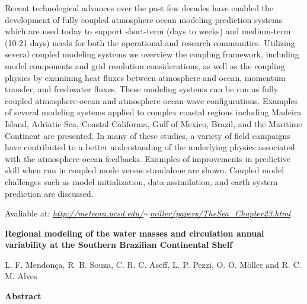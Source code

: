  Recent technological advances over the past few decades have enabled the development of fully coupled atmosphere-ocean modeling prediction systems which are used today to support 
          short-term (days to weeks) and medium-term (10-21 days) needs for both the operational and research communities. Utilizing several coupled modeling systems we overview the coupling 
          framework, including model components and grid resolution considerations, as well as the coupling physics by examining heat fluxes between atmosphere and ocean, momentum transfer, 
          and freshwater fluxes. These modeling systems can be run as fully coupled atmosphere-ocean and atmosphere-ocean-wave configurations. Examples of several modeling systems applied to 
          complex coastal regions including Madeira Island, Adriatic Sea, Coastal California, Gulf of Mexico, Brazil, and the Maritime Continent are presented. In many of these studies, a 
          variety of field campaigns have contributed to a better understanding of the underlying physics associated with the atmosphere-ocean feedbacks. Examples of improvements in predictive 
          skill when run in coupled mode versus standalone are shown. Coupled model challenges such as model initialization, data assimilation, and earth system prediction are discussed.
\bigskip

 \textcolor{black}{}
\bigskip

 Avaliable at: \textcolor{bleu_cite}{\href{http://meteora.ucsd.edu/$\sim$miller/papers/TheSea\_Chapter23.html}{\textit{http://meteora.ucsd.edu/$\sim$miller/papers/TheSea\_Chapter23.html}}}
\bigskip

\newpage
\bigskip

 \begin{center} \textbf{Regional modeling of the water masses and circulation annual variability at the Southern Brazilian Continental Shelf}
\bigskip

 L. F. Mendonça, R. B. Souza, C. R. C. Aseff, L. P. Pezzi, O. O. Möller and R. C. M. Alves
\bigskip

 \textbf{Abstract}\end{center}
\bigskip

